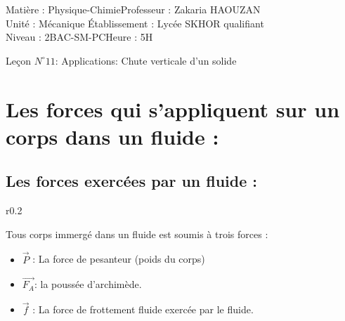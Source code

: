 \documentclass[12pt]{article}
\author{Zakaria HAOUZAN}
\date{\today}
\newcommand\headerMe[2]{\noindent{}#1\hfill#2}
\begin{document}
\headerMe{Matière : Physique-Chimie}{Professeur : Zakaria HAOUZAN}\\
\headerMe{Unité : Mécanique }{Établissement : Lycée SKHOR qualifiant}\\
\headerMe{Niveau : 2BAC-SM-PC}{Heure : 5H}\\

\begin{center}

    \Large{Leçon $N^{\circ} 11 $: \color{red}Applications: Chute verticale d'un solide }
\end{center}


\section{Les forces qui s'appliquent sur un corps dans un fluide : }

\subsection{Les forces exercées par un fluide : }

\begin{wrapfigure}[1]{r}{0.2\textwidth}
\end{wrapfigure}
Tous corps immergé dans un fluide est soumis à trois forces : 

\begin{itemize}
	\item $\vec{P}$ : La force de pesanteur (poids du corps)
	\item $\vec{F_A}$: la poussée d'archimède.
	\item $\vec{f}$ : La force de frottement fluide exercée par le fluide. 
\end{itemize}
\end{document}
